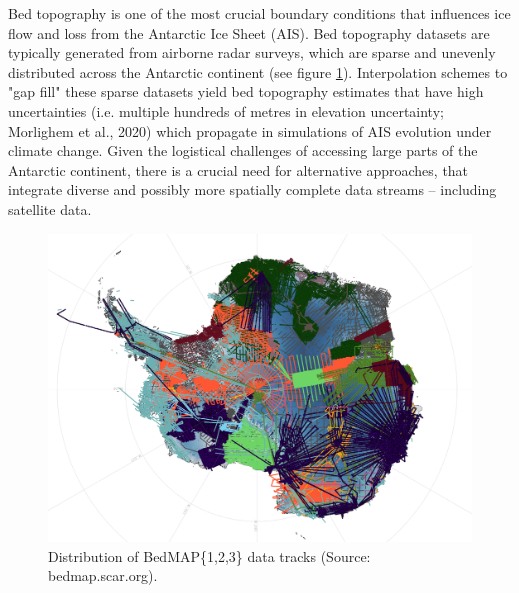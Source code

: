 


Bed topography is one of the most crucial boundary conditions that influences ice flow and loss from the Antarctic Ice Sheet (AIS)\cite{Morlighem_2020}. Bed topography datasets are typically generated from airborne radar surveys, which are sparse and unevenly distributed across the Antarctic continent (see figure \ref{fig:BedMAP}). Interpolation schemes to "gap fill" these sparse datasets yield bed topography estimates that have high uncertainties (i.e. multiple hundreds of metres in elevation uncertainty; Morlighem et al., 2020) which propagate in simulations of AIS evolution under climate change\cite{Castleman_2022}. Given the logistical challenges of accessing large parts of the Antarctic continent, there is a crucial need for alternative approaches, that integrate diverse and possibly more spatially complete data streams – including satellite data.
\begin{figure}[H] %
    \includegraphics[scale=0.4]{bedmap.png}
    \caption{Distribution of BedMAP\{1,2,3\} data tracks (Source: bedmap.scar.org).}
    \label{fig:BedMAP}
\end{figure}


